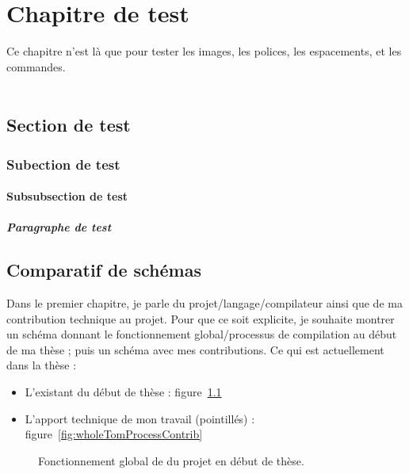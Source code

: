 \chapter{Chapitre de test}
\label{ch:test}

Ce chapitre n'est là que pour tester les images, les polices, les espacements,
et les commandes.\\
\\

\section{Section de test}

\subsection{Subection de test}

\subsubsection{Subsubsection de test}

\paragraph{Paragraphe de test}

\section{Comparatif de schémas}

Dans le premier chapitre, je parle du projet/langage/compilateur {\tom} ainsi
que de ma contribution technique au projet. Pour que ce soit explicite, je
souhaite montrer un schéma donnant le fonctionnement global/processus de
compilation {\tom} au début de ma thèse ; puis un schéma avec mes
contributions.
Ce qui est actuellement dans la thèse :
\begin{itemize}
  \item L'existant du début de thèse : figure~\ref{fig:wholeTomProcessBeforeThesis}
  \item L'apport technique de mon travail (pointillés) : figure~\ref{fig:wholeTomProcessContrib}
\end{itemize}

\begin{figure}[H]
  \begin{center}
    
  \end{center}
  \caption{Fonctionnement global de du projet {\tom} en début de thèse.}
  \label{fig:wholeTomProcessBeforeThesis}
\end{figure}

